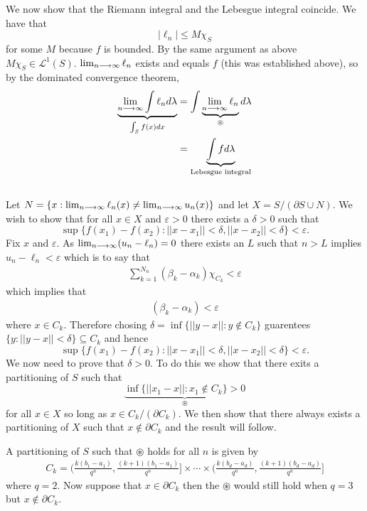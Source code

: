 \documentclass{unswmaths}
\begin{document}
We now show that the Riemann integral and the Lebesgue integral coincide. 
We have that 
$$
    |\ell_n| \leq M \chi_{S} 
$$
for some $ M $ because $ f $ is bounded. By the same argument as above $ M \chi_{S} \in \mathcal{L}^1(S) $. $ \lim_{n\longrightarrow\infty} \ell_n $ exists and equals $ f $ (this was established above), so by the dominated convergence theorem,
\begin{align*}
    \underbrace{\lim_{n\longrightarrow\infty} \int \ell_n d\lambda}_{\int_{S} f(x) dx} &= \int \underbrace{\lim_{n\longrightarrow\infty} \ell_n}_{\circledast} d\lambda \\
    &= \underbrace{\int f d\lambda}_{\text{Lebesgue integral}} \\
\end{align*}

\subsection{}
Let $ N = \{ x : \lim_{n\longrightarrow\infty}\ell_n(x) \neq \lim_{n\longrightarrow\infty}u_n(x) \} $ and
let $ X = S / (\partial S \cup N ) $. 
We wish to show that for all $ x \in X $ and $ \varepsilon > 0 $ there exists a $ \delta > 0 $ such that
$$ \sup\{ f(x_1) - f(x_2) : ||x-x_1|| < \delta, ||x-x_2|| < \delta \} < \varepsilon. $$
Fix $ x $ and $ \varepsilon $. As $ \lim_{n\longrightarrow\infty} (u_n - \ell_n) = 0 $ there exists an $ L $ such that $ n > L $ implies $ u_n - \ell_n < \varepsilon $
which is to say that 
\begin{align*}
    \sum_{k=1}^{N_n} (\beta_k - \alpha_k) \chi_{C_k} < \varepsilon
\end{align*}
which implies that
\begin{align*}
    (\beta_k - \alpha_k) < \varepsilon
\end{align*}
where $ x \in C_k $. Therefore chosing $ \delta = \inf\{ ||y-x|| : y \not\in C_k \} $ guarentees
$ \{ y : ||y - x || < \delta \} \subseteq C_k $ and hence $$ \sup\{ f(x_1) - f(x_2) : ||x-x_1|| < \delta, ||x-x_2|| < \delta \} < \varepsilon. $$
We now need to prove that $ \delta > 0 $. To do this we show that there exits a partitioning of $ S $ such that $$ \underbrace{\inf\{ || x_1 - x || : x_1 \not\in C_k \} > 0}_{\circledast}$$ for all $ x \in X $ so long as $ x \in C_k / (\partial C_k ) $. We then show that there always exists a partitioning of $ X $ such that $ x \not\in \partial C_k $ and the result will follow. 

A partitioning of $ S $ such that $ \circledast $ holds for all $ n $ is given by
\begin{align}
    C_k = \Big( \frac{k(b_1 - a_1)}{q^n}, \frac{(k+1)(b_1 - a_1)}{q^n}\Big] \times \cdots \times \Big( \frac{k(b_d-a_d)}{q^n}, \frac{(k+1)(b_d-a_d)}{q^n} \Big]
\end{align}
where $ q = 2 $. Now suppose that $ x \in \partial C_k $ then the $ \circledast $ would still hold when $ q = 3 $ but $ x \not\in \partial C_k $. 
\end{document}
